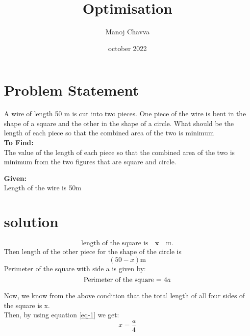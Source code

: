 \documentclass[journal,12pt,twocolumn]{IEEEtran}
\title{Optimisation}
\author{Manoj Chavva}
\date{october 2022}
\let\vec\mathbf
\begin{document}
\maketitle
\section{Problem Statement}

\noindent A wire of length 50 m is cut into two pieces. One piece of the wire is bent in the shape of a square and the other in the shape of a circle. What should be the length of each piece so that the combined area of the two is minimum \\

\noindent \textbf{To Find:} \\
The value of the length of each piece so that the combined area of the two is minimum from the two figures that are square and circle.

\noindent \textbf{Given:} \\
Length of the wire is 50m
\section{solution}
\begin{equation}
\text{length of the square is} \quad \vec{x} \quad \text{m} .
\end{equation} 
Then length of the other piece for the shape of the circle is \begin{equation}
(50-x) \text{m}
\end{equation} 
Perimeter of the square with side a is given by: \\
\begin{equation}
\text{Perimeter of the square = } 4a \\
\label{eq-1}
\end{equation}

Now, we know from the above condition that the total length of all four sides of the square is x.\\

Then, by using equation \ref{eq-1} we get:
\begin{equation}
x = \frac{a}{4}
\end{equation}
\end{document}
